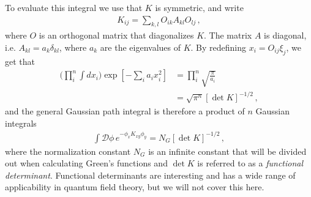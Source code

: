 To evaluate this integral we use that $K$ is symmetric, and write
\begin{align}
    K_{ij}=\sum_{k,l}O_{ik}A_{kl}O_{lj}\,,
\end{align}
where $O$ is an orthogonal matrix that diagonalizes $K$. The matrix $A$ is diagonal, i.e. $A_{kl}=a_{k}\delta_{kl}$, where $a_k$ are the eigenvalues of $K$. By redefining $x_i=O_{ij}\xi_j$, we get that
\begin{align}
    \Big(\prod_{i}^{n}\int dx_{i}\Big)\exp[-\sum_{i}a_{i}x_{i}^{2}]&=\prod_{i}^{n}\sqrt{\frac{\pi}{a_{i}}}\nonumber
    \\
    &=\sqrt{\pi^{n}}[\det K]^{-1/2}\,,
\end{align}
and the general Gaussian path integral is therefore a product of $n$ Gaussian integrals
\begin{align}
    \int\mathcal{D}\phi\,e^{-\phi_{x} K_{xy}\phi_{y}}=N_{G}[\det K]^{-1/2}\,,
\end{align}
where the normalization constant $N_{G}$ is an infinite constant that will be divided out when calculating Green's functions and $\det K$ is referred to as a \emph{functional determinant}. Functional determinants are interesting and has a wide range of applicability in quantum field theory, but we will not cover this here.

